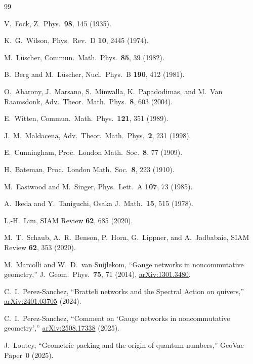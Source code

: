 \documentclass[aps,pra,twocolumn,superscriptaddress,longbibliography]{revtex4-2}
\begin{document}
\begin{thebibliography}{99}

V.~Fock, Z.\ Phys.\ \textbf{98}, 145 (1935).

K.~G.~Wilson, Phys.\ Rev.\ D \textbf{10}, 2445 (1974).

M.~L\"uscher, Commun.\ Math.\ Phys.\ \textbf{85}, 39 (1982).

B.~Berg and M.~L\"uscher, Nucl.\ Phys.\ B \textbf{190}, 412 (1981).

O.~Aharony, J.~Marsano, S.~Minwalla, K.~Papadodimas, and M.~Van
Raamsdonk, Adv.\ Theor.\ Math.\ Phys.\ \textbf{8}, 603 (2004).

E.~Witten, Commun.\ Math.\ Phys.\ \textbf{121}, 351 (1989).

J.~M.~Maldacena, Adv.\ Theor.\ Math.\ Phys.\ \textbf{2}, 231 (1998).

E.~Cunningham, Proc.\ London Math.\ Soc.\ \textbf{8}, 77 (1909).

H.~Bateman, Proc.\ London Math.\ Soc.\ \textbf{8}, 223 (1910).

M.~Eastwood and M.~Singer, Phys.\ Lett.\ A \textbf{107}, 73 (1985).

A.~Ikeda and Y.~Taniguchi, Osaka J.\ Math.\ \textbf{15}, 515 (1978).

L.-H.~Lim, SIAM Review \textbf{62}, 685 (2020).

M.~T.~Schaub, A.~R.~Benson, P.~Horn, G.~Lippner, and A.~Jadbabaie,
SIAM Review \textbf{62}, 353 (2020).

M.~Marcolli and W.~D.~van Suijlekom,
``Gauge networks in noncommutative geometry,''
J.\ Geom.\ Phys.\ \textbf{75}, 71 (2014),
\href{https://arxiv.org/abs/1301.3480}{arXiv:1301.3480}.

C.~I.~Perez-Sanchez,
``Bratteli networks and the Spectral Action on quivers,''
\href{https://arxiv.org/abs/2401.03705}{arXiv:2401.03705} (2024).

C.~I.~Perez-Sanchez,
``Comment on `Gauge networks in noncommutative geometry',''
\href{https://arxiv.org/abs/2508.17338}{arXiv:2508.17338} (2025).

J.~Loutey, ``Geometric packing and the origin of quantum numbers,''
GeoVac Paper~0 (2025).


\end{thebibliography}
\end{document}
